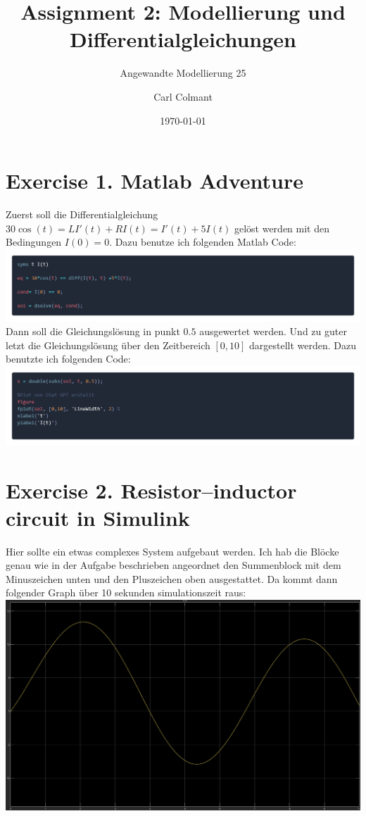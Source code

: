 \documentclass{scrartcl}
\title{Assignment 2: Modellierung und Differentialgleichungen}
\subtitle{Angewandte Modellierung 25}
\author{Carl Colmant}
\date{\today}
\begin{document}
\maketitle
\newpage
\section*{Exercise 1. Matlab Adventure}
Zuerst soll die Differentialgleichung $30\cos(t) = LI'(t)+ RI(t) = I'(t) + 5I(t)$ gelöst werden mit den Bedingungen $I(0) = 0$. Dazu benutze ich folgenden Matlab Code:\\
\includegraphics[scale=0.18]{Matlab_adventure.png}\\
Dann soll die Gleichungslösung in punkt $0.5$ ausgewertet werden. Und zu guter letzt die Gleichungslösung über den Zeitbereich $[0, 10]$ dargestellt werden. Dazu benutzte ich folgenden Code:\\
\includegraphics[scale=0.18]{Matlab_adventure2.png}\\


\section*{Exercise 2. Resistor--inductor circuit in Simulink}
Hier sollte ein etwas complexes System aufgebaut werden. Ich hab die Blöcke genau wie in der Aufgabe beschrieben angeordnet den Summenblock mit dem Minuszeichen unten und den Pluszeichen oben ausgestattet. Da kommt dann folgender Graph über 10 sekunden simulationszeit raus:\\
\includegraphics[scale=0.4]{RIC_out.png} 
\end{document}
